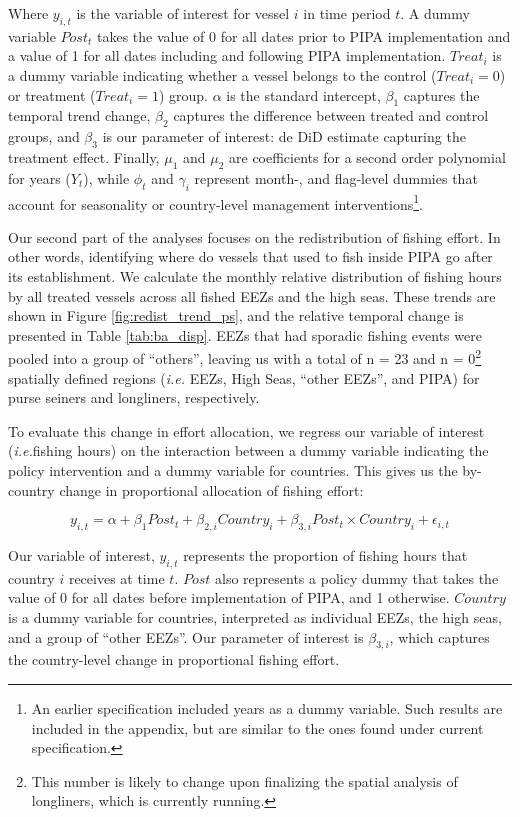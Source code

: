 \documentclass[11pt,]{article}
\let\rmarkdownfootnote\footnote%
\def\footnote{\protect\rmarkdownfootnote}
\begin{document}
Where \(y_{i,t}\) is the variable of interest for vessel \(i\) in time
period \(t\). A dummy variable \(Post_t\) takes the value of 0 for all
dates prior to PIPA implementation and a value of 1 for all dates
including and following PIPA implementation. \(Treat_i\) is a dummy
variable indicating whether a vessel belongs to the control
(\(Treat_i = 0\)) or treatment (\(Treat_i = 1\)) group. \(\alpha\) is
the standard intercept, \(\beta_1\) captures the temporal trend change,
\(\beta_2\) captures the difference between treated and control groups,
and \(\beta_3\) is our parameter of interest: de DiD estimate capturing
the treatment effect. Finally, \(\mu_1\) and \(\mu_2\) are coefficients
for a second order polynomial for years (\(Y_t\)), while \(\phi_t\) and
\(\gamma_i\) represent month-, and flag-level dummies that account for
seasonality or country-level management interventions\footnote{An
  earlier specification included years as a dummy variable. Such results
  are included in the appendix, but are similar to the ones found under
  current specification.}.

Our second part of the analyses focuses on the redistribution of fishing
effort. In other words, identifying where do vessels that used to fish
inside PIPA go after its establishment. We calculate the monthly
relative distribution of fishing hours by all treated vessels across all
fished EEZs and the high seas. These trends are shown in Figure
\ref{fig:redist_trend_ps}, and the relative temporal change is presented
in Table \ref{tab:ba_disp}. EEZs that had sporadic fishing events were
pooled into a group of ``others'', leaving us with a total of n = 23 and
n = 0\footnote{This number is likely to change upon finalizing the
  spatial analysis of longliners, which is currently running.} spatially
defined regions (\emph{i.e.} EEZs, High Seas, ``other EEZs'', and PIPA)
for purse seiners and longliners, respectively.

To evaluate this change in effort allocation, we regress our variable of
interest (\emph{i.e.}fishing hours) on the interaction between a dummy
variable indicating the policy intervention and a dummy variable for
countries. This gives us the by-country change in proportional
allocation of fishing effort:

\[
y_{i,t} = \alpha + \beta_1Post_t + \beta_{2,i}Country_i + \beta_{3,i}Post_t \times Country_i + \epsilon_{i,t}
\]

Our variable of interest, \(y_{i,t}\) represents the proportion of
fishing hours that country \(i\) receives at time \(t\). \(Post\) also
represents a policy dummy that takes the value of 0 for all dates before
implementation of PIPA, and 1 otherwise. \(Country\) is a dummy variable
for countries, interpreted as individual EEZs, the high seas, and a
group of ``other EEZs''. Our parameter of interest is \(\beta_{3,i}\),
which captures the country-level change in proportional fishing effort.
\end{document}
